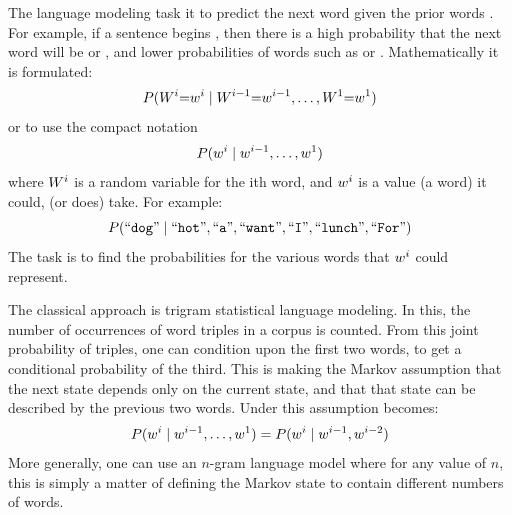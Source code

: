 \documentclass[parskip]{komatufte}
\begin{document}
The language modeling task it to predict the next word given the prior words .
For example, if a sentence begins , then there is a high probability that the next word will be  or ,
and lower probabilities of words such as  or .
Mathematically it is formulated: 
\begin{equation}\label{equ:langmodel}
	P(\n W_i{=}\n w_i \mid \n W_{i-1}{=}\n w_{i-1}, \ldots, \n W_1{=}\n w_1)
\end{equation}
or to use the compact notation 
\begin{equation}\label{equ:langmodelcompact}
P(\n w_i \mid \n w_{i-1}, \ldots, \n w_1)
\end{equation}
where $\n W_i$ is a random variable for the ith word, and $\n w_i$ is a value (a word) it could, (or does) take.
For example: 
\begin{equation*}
P(\natlang{dog} \mid \natlang{hot}, \natlang{a}, \natlang{want}, \natlang{I}, \natlang{lunch}, \natlang{For})
\end{equation*}
The task is to find the probabilities for the various words that $\n w_i$ could represent.


  
The classical approach is trigram statistical language modeling.
In this, the number of occurrences of word triples in a corpus is counted.
From this joint probability of triples, one can condition upon the first two words,
to get a conditional probability of the third.
This is making the Markov assumption that the next state depends only on the current state,
and that that state can be described by the previous two words.
Under this assumption  becomes:
\begin{equation}\label{equ:trigramlangmodel}
P(\n w_i \mid \n w_{i-1}, \ldots, \n w_1) = P(\n w_i \mid \n w_{i-1}, \n w_{i-2})
\end{equation}
More generally, one can use an $n$-gram language model where for any value of $n$,
this is simply a matter of defining the Markov state to contain different numbers of words.
\end{document}
